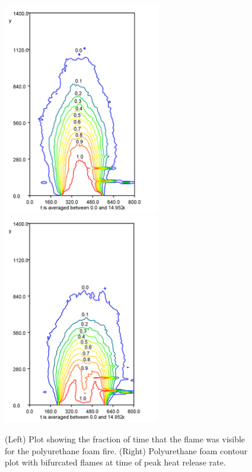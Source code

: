 \documentclass[twoside]{uocthesis}
\begin{document}
{\begin{figure}
  \includegraphics[width=2.7in]{../Figures/Fig22}
  \includegraphics[width=2.7in]{../Figures/Fig23} \\
  \caption[Visibility fractions for the polyurethane foam fire]{(Left) Plot showing the fraction of time that the flame was visible for the polyurethane foam fire. (Right) Polyurethane foam contour plot with bifurcated flames at time of peak heat release rate.}
  \label{Foam_Contours}
\end{figure}

}
\end{document}
